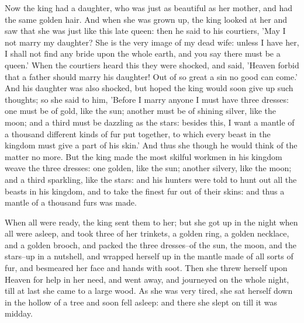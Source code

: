 \documentclass[12pt]{book}
\begin{document}
Now the king had a daughter, who was just as beautiful as her mother,
and had the same golden hair. And when she was grown up, the king
looked at her and saw that she was just like this late queen: then he
said to his courtiers, 'May I not marry my daughter? She is the very
image of my dead wife: unless I have her, I shall not find any bride
upon the whole earth, and you say there must be a queen.' When the
courtiers heard this they were shocked, and said, 'Heaven forbid that
a father should marry his daughter! Out of so great a sin no good can
come.' And his daughter was also shocked, but hoped the king would
soon give up such thoughts; so she said to him, 'Before I marry anyone
I must have three dresses: one must be of gold, like the sun; another
must be of shining silver, like the moon; and a third must be dazzling
as the stars: besides this, I want a mantle of a thousand different
kinds of fur put together, to which every beast in the kingdom must
give a part of his skin.' And thus she though he would think of the
matter no more. But the king made the most skilful workmen in his
kingdom weave the three dresses: one golden, like the sun; another
silvery, like the moon; and a third sparkling, like the stars: and his
hunters were told to hunt out all the beasts in his kingdom, and to
take the finest fur out of their skins: and thus a mantle of a
thousand furs was made.

When all were ready, the king sent them to her; but she got up in the
night when all were asleep, and took three of her trinkets, a golden
ring, a golden necklace, and a golden brooch, and packed the three
dresses--of the sun, the moon, and the stars--up in a nutshell, and
wrapped herself up in the mantle made of all sorts of fur, and
besmeared her face and hands with soot. Then she threw herself upon
Heaven for help in her need, and went away, and journeyed on the whole
night, till at last she came to a large wood. As she was very tired,
she sat herself down in the hollow of a tree and soon fell asleep: and
there she slept on till it was midday.
\end{document}
